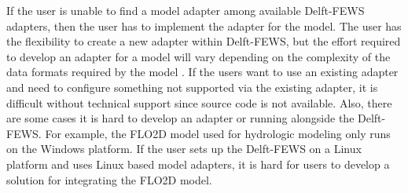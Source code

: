 If the user is unable to find a model adapter among available Delft-FEWS adapters, then the user has to implement the adapter for the model. The user has the flexibility to create a new adapter within Delft-FEWS, but the effort required to develop an adapter for a model will vary depending on the complexity of the data formats required by the model \cite{Werner2013TheSystem}. If the users want to use an existing adapter and need to configure something not supported via the existing adapter, it is difficult without technical support since source code is not available. Also, there are some cases it is hard to develop an adapter or running alongside the Delft-FEWS. For example, the FLO2D model used for hydrologic modeling only runs on the Windows platform. If the user sets up the Delft-FEWS on a Linux platform and uses Linux based model adapters, it is hard for users to develop a solution for integrating the FLO2D model.
